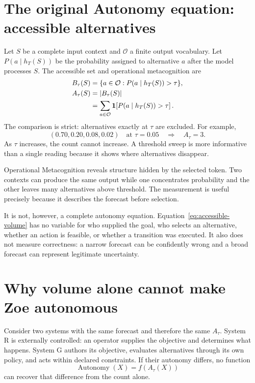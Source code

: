\documentclass[11pt,a4paper]{article}
\newcommand{\indicator}{\mathbf 1}
\begin{document}
\section{The original Autonomy equation: accessible alternatives}
Let $S$ be a complete input context and $\mathcal O$ a finite output vocabulary. Let $P(a\mid h_T(S))$ be the probability assigned to alternative $a$ after the model processes $S$. The accessible set and operational metacognition are
\begin{align}
B_\tau(S)&=\{a\in\mathcal O:P(a\mid h_T(S))>\tau\},\label{eq:accessible-set}\\
A_\tau(S)&=|B_\tau(S)|\notag\\
&=\sum_{a\in\mathcal O}\indicator\!\left[P(a\mid h_T(S))>\tau\right].
\label{eq:accessible-volume}
\end{align}
The comparison is strict: alternatives exactly at $\tau$ are excluded. For example,
\[
(0.70,0.20,0.08,0.02)\quad\text{at }\tau=0.05
\quad\Longrightarrow\quad A_\tau=3.
\]
As $\tau$ increases, the count cannot increase. A threshold sweep is more informative than a single reading because it shows where alternatives disappear.

Operational Metacognition reveals structure hidden by the selected token. Two contexts can produce the same output while one concentrates probability and the other leaves many alternatives above threshold. The measurement is useful precisely because it describes the forecast before selection.

It is not, however, a complete autonomy equation. Equation~\eqref{eq:accessible-volume} has no variable for who supplied the goal, who selects an alternative, whether an action is feasible, or whether a transition was executed. It also does not measure correctness: a narrow forecast can be confidently wrong and a broad forecast can represent legitimate uncertainty.

\section{Why volume alone cannot make Zoe autonomous}
Consider two systems with the same forecast and therefore the same $A_\tau$. System R is externally controlled: an operator supplies the objective and determines what happens. System G authors its objective, evaluates alternatives through its own policy, and acts within declared constraints. If their autonomy differs, no function
\begin{equation}
\operatorname{Autonomy}(X)=f(A_\tau(X))
\end{equation}
can recover that difference from the count alone.
\end{document}
